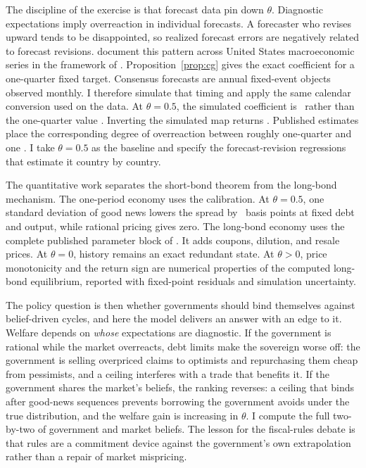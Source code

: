 \documentclass[11pt]{article}
\theoremstyle{definition}
\begin{document}
The discipline of the exercise is that forecast data pin down $\theta$. Diagnostic expectations imply overreaction in individual forecasts. A forecaster who revises upward tends to be disappointed, so realized forecast errors are negatively related to forecast revisions. \citet{BordaloGennaioliMaShleifer2020} document this pattern across United States macroeconomic series in the framework of \citet{CoibionGorodnichenko2015}. Proposition~\ref{prop:cg} gives the exact coefficient for a one-quarter fixed target. Consensus forecasts are annual fixed-event objects observed monthly. I therefore simulate that timing and apply the same calendar conversion used on the data. At $\theta=0.5$, the simulated coefficient is \SurveyBetaHalf\ rather than the one-quarter value \CGbetaHalf. Inverting the simulated map returns \SurveyThetaRecovered. Published estimates place the corresponding degree of overreaction between roughly one-quarter and one \citep{BordaloGennaioliShleifer2018, BordaloGennaioliMaShleifer2020}. I take $\theta=0.5$ as the baseline and specify the forecast-revision regressions that estimate it country by country.

The quantitative work separates the short-bond theorem from the long-bond mechanism. The one-period economy uses the \citet{Arellano2008} calibration. At $\theta=0.5$, one standard deviation of good news lowers the spread by \NewsBpDiagAbs\ basis points at fixed debt and output, while rational pricing gives zero. The long-bond economy uses the complete published parameter block of \citet{ChatterjeeEyigungor2012}. It adds coupons, dilution, and resale prices. At $\theta=0$, history remains an exact redundant state. At $\theta>0$, price monotonicity and the return sign are numerical properties of the computed long-bond equilibrium, reported with fixed-point residuals and simulation uncertainty.

The policy question is then whether governments should bind themselves against belief-driven cycles, and here the model delivers an answer with an edge to it. Welfare depends on \emph{whose} expectations are diagnostic. If the government is rational while the market overreacts, debt limits make the sovereign worse off: the government is selling overpriced claims to optimists and repurchasing them cheap from pessimists, and a ceiling interferes with a trade that benefits it. If the government shares the market's beliefs, the ranking reverses: a ceiling that binds after good-news sequences prevents borrowing the government avoids under the true distribution, and the welfare gain is increasing in $\theta$. I compute the full two-by-two of government and market beliefs. The lesson for the fiscal-rules debate is that rules are a commitment device against the government's own extrapolation rather than a repair of market mispricing.
\end{document}
